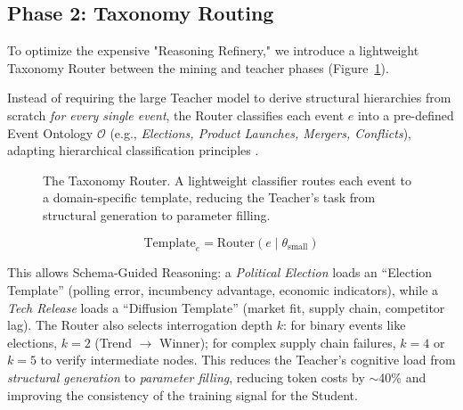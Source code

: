 \documentclass[11pt,a4paper]{article}
\begin{document}
\subsection{Phase 2: Taxonomy Routing}
\label{sec:taxonomy}

To optimize the expensive "Reasoning Refinery," we introduce a lightweight Taxonomy Router between the mining and teacher phases (Figure~\ref{fig:router}).

Instead of requiring the large Teacher model to derive structural hierarchies from scratch \textit{for every single event}, the Router classifies each event $e$ into a pre-defined Event Ontology $\mathcal{O}$ (e.g., \textit{Elections, Product Launches, Mergers, Conflicts}), adapting hierarchical classification principles \cite{giunchiglia2020coherent}.

\begin{figure}[htbp]
\centering
{}
\caption{The Taxonomy Router. A lightweight classifier routes each event to a domain-specific template, reducing the Teacher's task from structural generation to parameter filling.}
\label{fig:router}
\end{figure}

\begin{equation}
    \text{Template}_e = \text{Router}(e \mid \theta_{\text{small}})
    \label{eq:router}
\end{equation}

This allows Schema-Guided Reasoning: a \textit{Political Election} loads an ``Election Template'' (polling error, incumbency advantage, economic indicators), while a \textit{Tech Release} loads a ``Diffusion Template'' (market fit, supply chain, competitor lag). The Router also selects interrogation depth $k$: for binary events like elections, $k=2$ (Trend $\rightarrow$ Winner); for complex supply chain failures, $k=4$ or $k=5$ to verify intermediate nodes. This reduces the Teacher's cognitive load from \textit{structural generation} to \textit{parameter filling}, reducing token costs by $\sim$40\% and improving the consistency of the training signal for the Student.
\end{document}
